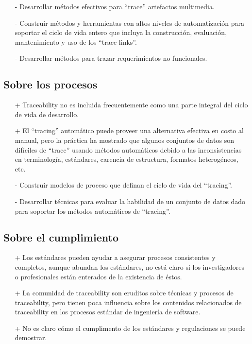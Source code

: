\documentclass[a4paper,12pt,oneside]{book}
\begin{document}
\begin{itemize}
\item[-]     Desarrollar métodos efectivos para ``trace'' artefactos multimedia.
\item[-]    Construir métodos y herramientas con altos niveles de automatización para soportar el ciclo de vida entero que incluya la construcción, evaluación, mantenimiento y uso de los “trace links”.
\item[-]    Desarrollar métodos para trazar requerimientos no funcionales.
\end{itemize}

\subsection{Sobre los procesos}

\begin{itemize}
\item[+]     Traceability no es incluida frecuentemente como una parte integral del ciclo de vida de desarrollo.
\item[+]    El “tracing” automático puede proveer una alternativa efectiva en costo al manual, pero la práctica ha mostrado que algunos conjuntos de datos son difíciles de “trace” usando métodos automáticos debido a las inconsistencias en terminología, estándares, carencia de estructura, formatos heterogéneos, etc.
\end{itemize}

\begin{itemize}
\item[-]     Construir modelos de proceso que definan el ciclo de vida del “tracing”.
 \item[-]   Desarrollar técnicas para evaluar la habilidad de un conjunto de datos dado para soportar los métodos automáticos de “tracing”.
\end{itemize}

\subsection{Sobre el cumplimiento}

\begin{itemize}
\item[+]     Los estándares pueden ayudar a asegurar procesos consistentes y completos, aunque abundan los estándares, no está claro si los investigadores o profesionales están enterados de la existencia de éstos.
\item[+]    La comunidad de traceability son eruditos sobre técnicas y procesos de traceability, pero tienen poca influencia sobre los contenidos relacionados de traceability en los procesos estándar de ingeniería de software.
\item[+]    No es claro cómo el cumplimento de los estándares y regulaciones se puede demostrar.
\end{itemize}
\end{document}

